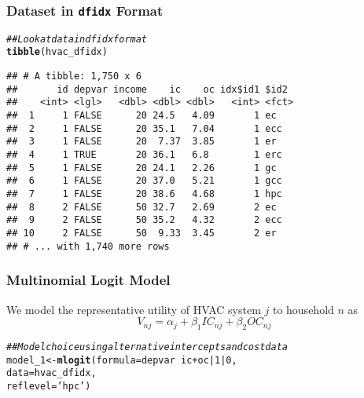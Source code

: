 \documentclass{beamer}\usepackage[]{graphicx}\usepackage[]{xcolor}
\makeatletter
\newcommand{\hlnum}[1]{\textcolor[rgb]{0.686,0.059,0.569}{#1}}%
\newcommand{\hlstr}[1]{\textcolor[rgb]{0.192,0.494,0.8}{#1}}%
\newcommand{\hlcom}[1]{\textcolor[rgb]{0.678,0.584,0.686}{\textit{#1}}}%
\newcommand{\hlopt}[1]{\textcolor[rgb]{0,0,0}{#1}}%
\newcommand{\hlstd}[1]{\textcolor[rgb]{0.345,0.345,0.345}{#1}}%
\newcommand{\hlkwb}[1]{\textcolor[rgb]{0.69,0.353,0.396}{#1}}%
\newcommand{\hlkwc}[1]{\textcolor[rgb]{0.333,0.667,0.333}{#1}}%
\newcommand{\hlkwd}[1]{\textcolor[rgb]{0.737,0.353,0.396}{\textbf{#1}}}%
\newenvironment{kframe}{%
 \def\at@end@of@kframe{}%
 \ifinner\ifhmode%
  \def\at@end@of@kframe{\end{minipage}}%
  \begin{minipage}{\columnwidth}%
 \fi\fi%
 \def\FrameCommand##1{\hskip\@totalleftmargin \hskip-\fboxsep
 \colorbox{shadecolor}{##1}\hskip-\fboxsep
     \hskip-\linewidth \hskip-\@totalleftmargin \hskip\columnwidth}%
 \MakeFramed {\advance\hsize-\width
   \@totalleftmargin\z@ \linewidth\hsize
   \@setminipage}}%
 {\par\unskip\endMakeFramed%
 \at@end@of@kframe}
\newenvironment{knitrout}{}{} %
\makeatother
\begin{document}
\begin{frame}[fragile]\frametitle{Dataset in \texttt{dfidx} Format}
\begin{knitrout}\footnotesize
{}\color{fgcolor}\begin{kframe}
\begin{alltt}
\hlcom{## Look at data in dfidx format}
\hlkwd{tibble}\hlstd{(hvac_dfidx)}
\end{alltt}
\begin{verbatim}
## # A tibble: 1,750 x 6
##       id depvar income    ic    oc idx$id1 $id2 
##    <int> <lgl>   <dbl> <dbl> <dbl>   <int> <fct>
##  1     1 FALSE      20 24.5   4.09       1 ec   
##  2     1 FALSE      20 35.1   7.04       1 ecc  
##  3     1 FALSE      20  7.37  3.85       1 er   
##  4     1 TRUE       20 36.1   6.8        1 erc  
##  5     1 FALSE      20 24.1   2.26       1 gc   
##  6     1 FALSE      20 37.0   5.21       1 gcc  
##  7     1 FALSE      20 38.6   4.68       1 hpc  
##  8     2 FALSE      50 32.7   2.69       2 ec   
##  9     2 FALSE      50 35.2   4.32       2 ecc  
## 10     2 FALSE      50  9.33  3.45       2 er   
## # ... with 1,740 more rows
\end{verbatim}
\end{kframe}
\end{knitrout}
\end{frame}

\begin{frame}[fragile]\frametitle{Multinomial Logit Model}
    We model the representative utility of HVAC system $j$ to household $n$ as
    $$V_{nj} = \alpha_j + \beta_1 IC_{nj} + \beta_2 OC_{nj}$$
\begin{knitrout}\footnotesize
{}\color{fgcolor}\begin{kframe}
\begin{alltt}
\hlcom{## Model choice using alternative intercepts and cost data}
\hlstd{model_1} \hlkwb{<-} \hlkwd{mlogit}\hlstd{(}\hlkwc{formula} \hlstd{= depvar} \hlopt{~} \hlstd{ic} \hlopt{+} \hlstd{oc} \hlopt{|} \hlnum{1} \hlopt{|} \hlnum{0}\hlstd{,}
                  \hlkwc{data} \hlstd{= hvac_dfidx,}
                  \hlkwc{reflevel} \hlstd{=} \hlstr{'hpc'}\hlstd{)}
\end{alltt}
\end{kframe}
\end{knitrout}
\end{frame}
\end{document}
